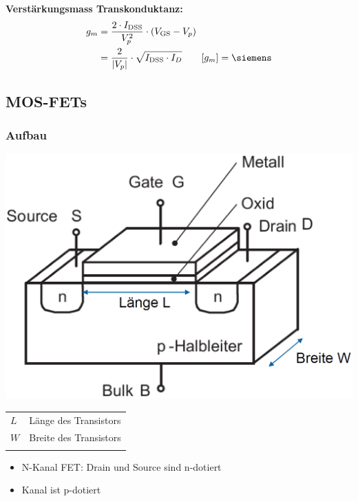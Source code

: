 \vspace{0.2cm}
\textbf{Verstärkungsmass Transkonduktanz:}
\begin{align*}
    g_m &= \frac{ 2 \cdot I_{\rm DSS}}{V_p^2} \cdot ( V_{\rm GS} - V_p ) \\
        &= \frac{2}{| V_p |} \cdot \sqrt{I_{\rm DSS} \cdot I_D} \qquad [g_m] = \siemens
\end{align*}


\subsection{MOS-FETs}

\subsubsection{Aufbau}

\begin{minipage}[t]{0.35\columnwidth}
    \includegraphics[align=c, width=\columnwidth]{images/mos_fet_aufbau.png}
\end{minipage}
\hfill
\begin{minipage}[c]{0.6\columnwidth}
    \begin{tabular}{l l}
        $L$ & Länge des Transistors  \\
        $W$ & Breite des Transistors \\
        \\
    \end{tabular}

    \begin{itemize}
        \item N-Kanal FET: Drain und Source sind n-dotiert
        \item Kanal ist p-dotiert
    \end{itemize}
\end{minipage}


